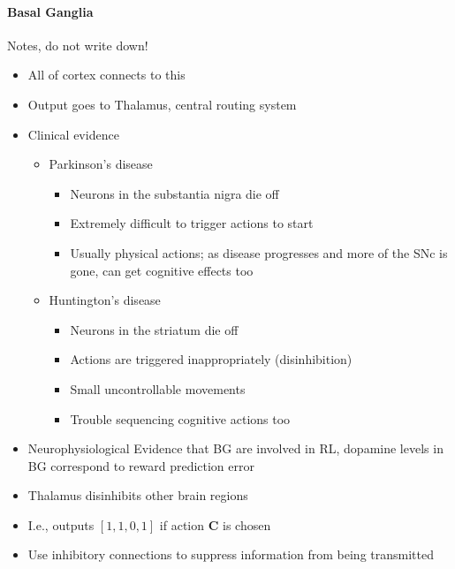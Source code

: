 \documentclass[10pt,letterpaper,oneside]{article}
\begin{document}
\paragraph{Basal Ganglia}
Notes, do not write down!
\begin{itemize}
	\item All of cortex connects to this
	\item Output goes to Thalamus, central routing system
	\item Clinical evidence
	\begin{itemize}
		\item Parkinson's disease
		\begin{itemize}			
			\item Neurons in the substantia nigra die off
			\item Extremely difficult to trigger actions to start
			\item Usually physical actions; as disease progresses and more of the SNc is gone, can get cognitive effects too
			
		\end{itemize}
		\item Huntington's disease
		
		\begin{itemize}
			\item Neurons in the striatum die off
			\item Actions are triggered inappropriately (disinhibition)
			\item Small uncontrollable movements
			\item Trouble sequencing cognitive actions too
		\end{itemize}
	\end{itemize}
	\item Neurophysiological Evidence that BG are involved in RL, dopamine levels in BG correspond to reward prediction error
	\item Thalamus disinhibits other brain regions
	\item I.e., outputs $[1, 1, 0, 1]$ if action \textbf{C} is chosen
	\item Use inhibitory connections to suppress information from being transmitted
\end{itemize}
\end{document}
